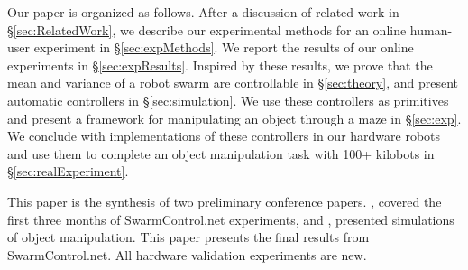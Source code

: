  Our paper is organized as follows.  After a discussion of related work in \S \ref{sec:RelatedWork},  we describe our experimental methods for an online human-user experiment in \S \ref{sec:expMethods}. We report the results of our online experiments in \S \ref{sec:expResults}. Inspired by these results, we prove that the mean and variance of a robot swarm are controllable in \S \ref{sec:theory}, and present automatic controllers in \S \ref{sec:simulation}. We use these controllers as primitives and present a framework for manipulating an object through a maze in \S \ref{sec:exp}. 
 We conclude with implementations of these controllers in our hardware robots and use them to complete an object manipulation task with 100+ kilobots in \S \ref{sec:realExperiment}.
 
 This paper is the synthesis of two preliminary conference papers.  \cite{swarmcontrol2013}, covered the first three months of SwarmControl.net experiments, and \cite{ShahrokhiIROS2015}, presented simulations of object manipulation.  This paper presents the final results from SwarmControl.net.  All hardware validation experiments are new.

